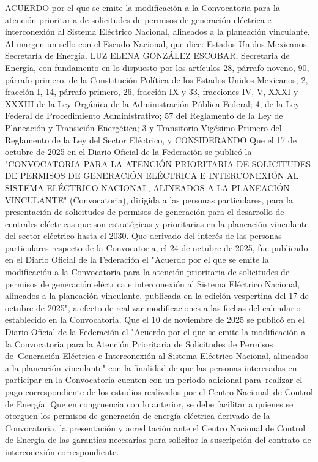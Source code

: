 \begingroup
\senertexto
ACUERDO por el que se emite la modificación a la Convocatoria para la atención prioritaria de solicitudes de permisos de generación eléctrica e interconexión al Sistema Eléctrico Nacional, alineados a la planeación vinculante.
Al margen un sello con el Escudo Nacional, que dice: Estados Unidos Mexicanos.- Secretaría de Energía.
LUZ ELENA GONZÁLEZ ESCOBAR, Secretaria de Energía, con fundamento en lo dispuesto por los artículos 28, párrafo noveno, 90, párrafo primero, de la Constitución Política de los Estados Unidos Mexicanos; 2, fracción I, 14, párrafo primero, 26, fracción IX y 33, fracciones IV, V, XXXI y XXXIII de la Ley Orgánica de la Administración Pública Federal; 4, de la Ley Federal de Procedimiento Administrativo;  57 del Reglamento de la Ley de Planeación y Transición Energética; 3 y Transitorio Vigésimo Primero del Reglamento de la Ley del Sector Eléctrico, y
CONSIDERANDO
Que el 17 de octubre de 2025 en el Diario Oficial de la Federación se publicó la "CONVOCATORIA PARA LA ATENCIÓN PRIORITARIA DE SOLICITUDES DE PERMISOS DE GENERACIÓN ELÉCTRICA E INTERCONEXIÓN AL SISTEMA ELÉCTRICO NACIONAL, ALINEADOS A LA PLANEACIÓN VINCULANTE" (Convocatoria), dirigida a las personas particulares, para la presentación de solicitudes de permisos de generación para el desarrollo de centrales eléctricas que son estratégicas y prioritarias en la planeación vinculante del sector eléctrico hasta el 2030.
Que derivado del interés de las personas particulares respecto de la Convocatoria, el 24 de octubre de 2025, fue publicado en el Diario Oficial de la Federación el "Acuerdo por el que se emite la modificación a la Convocatoria para la atención prioritaria de solicitudes de permisos de generación eléctrica e interconexión al Sistema Eléctrico Nacional, alineados a la planeación vinculante, publicada en la edición vespertina del 17 de octubre de 2025", a efecto de realizar modificaciones a las fechas del calendario establecido en la Convocatoria.
Que el 10 de noviembre de 2025 se publicó en el Diario Oficial de la Federación el "Acuerdo por el que se emite la modificación a la Convocatoria para la Atención Prioritaria de Solicitudes de Permisos de Generación Eléctrica e Interconexión al Sistema Eléctrico Nacional, alineados a la planeación vinculante" con la finalidad de que las personas interesadas en participar en la Convocatoria cuenten con un periodo adicional para realizar el pago correspondiente de los estudios realizados por el Centro Nacional de Control de Energía.
Que en congruencia con lo anterior, se debe facilitar a quienes se otorguen los permisos de generación de energía eléctrica derivado de la Convocatoria, la presentación y acreditación ante el Centro Nacional de Control de Energía de las garantías necesarias para solicitar la suscripción del contrato de interconexión correspondiente.
